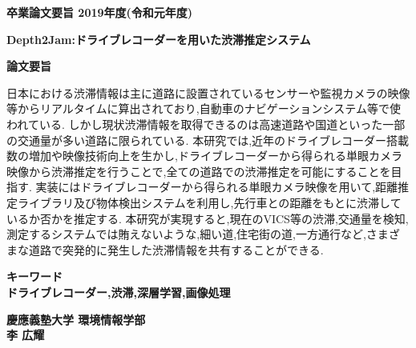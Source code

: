 \begin{center}
\textbf{\Large 卒業論文要旨 2019年度(令和元年度)}

\vspace{6.18mm}

\textbf{\Large Depth2Jam:ドライブレコーダーを用いた渋滞推定システム}
\end{center}

\vspace{10mm}

\begin{flushleft}
\textbf{論文要旨}\\
\end{flushleft}
日本における渋滞情報は主に道路に設置されているセンサーや監視カメラの映像等からリアルタイムに算出されており,自動車のナビゲーションシステム等で使われている.
しかし現状渋滞情報を取得できるのは高速道路や国道といった一部の交通量が多い道路に限られている.
本研究では,近年のドライブレコーダー搭載数の増加や映像技術向上を生かし,ドライブレコーダーから得られる単眼カメラ映像から渋滞推定を行うことで,全ての道路での渋滞推定を可能にすることを目指す.
実装にはドライブレコーダーから得られる単眼カメラ映像を用いて,距離推定ライブラリ及び物体検出システムを利用し,先行車との距離をもとに渋滞しているか否かを推定する.
本研究が実現すると,現在のVICS等の渋滞,交通量を検知,測定するシステムでは賄えないような,細い道,住宅街の道,一方通行など,さまざまな道路で突発的に発生した渋滞情報を共有することができる.


\begin{flushleft}
\textbf{キーワード}\\
\textbf{ドライブレコーダー,渋滞,深層学習,画像処理}

\end{flushleft}

\begin{flushright}
\textbf{慶應義塾大学 環境情報学部}\\
\textbf{李 広耀}
\end{flushright}
\newpage

